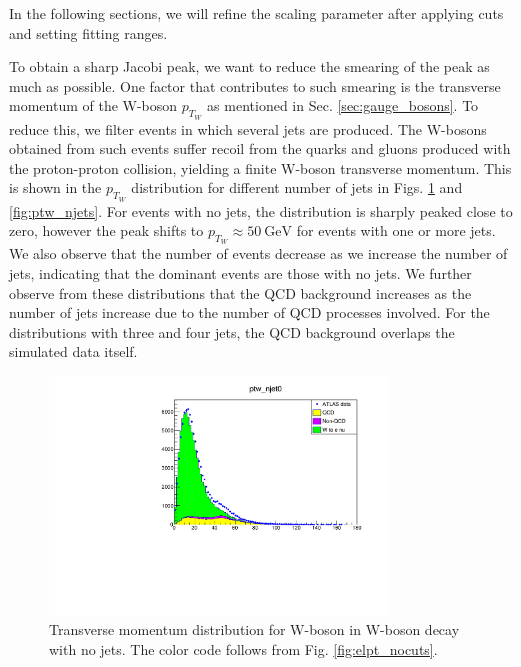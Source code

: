 \documentclass[a4paper]{report}
\numberwithin{equation}{section}
\begin{document}
In the following sections, we will refine the scaling parameter after applying cuts and setting fitting ranges. \par 

To obtain a sharp Jacobi peak, we want to reduce the smearing of the peak as much as possible. One factor that contributes 
to such smearing is the transverse momentum of the W-boson $p_{T_W}$ as mentioned in Sec. \ref*{sec:gauge_bosons}. To reduce this, 
we filter events in which several jets are produced. The W-bosons obtained from such events suffer recoil from the quarks and gluons 
produced with the proton-proton collision, yielding a finite W-boson transverse momentum. This is shown in the $p_{T_W}$ distribution 
for different number of jets in Figs. \ref{fig:ptw_njet0} and \ref{fig:ptw_njets}. For events with no jets, the distribution is 
sharply peaked close to zero, however the peak shifts to $p_{T_W} \approx \SI{50}{\giga\electronvolt}$ for events with one or more jets. 
We also observe that the number of events decrease as we increase the number of jets, indicating that the dominant events are those with 
no jets. We further observe from these distributions that the QCD background increases as the number of jets increase due to the number of QCD processes involved. For the distributions with 
three and four jets, the QCD background overlaps the simulated data itself.  

\begin{figure}[htpb]
    \centering
    \includegraphics[width=0.8\textwidth]{ptw_qcd30_njet0.pdf}
    \caption{Transverse momentum distribution for W-boson in W-boson decay with no jets. The color code follows from Fig. \ref{fig:elpt_nocuts}.}
    \label{fig:ptw_njet0}
\end{figure}
\end{document}
